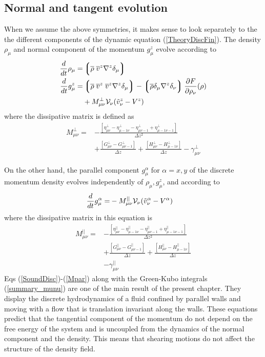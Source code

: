 \documentclass[b5paper,openright,11pt]{book}
\newcommand{\llg}{\left\lgroup}
\newcommand{\rlg}{\right\rgroup}
\begin{document}
\subsection{Normal and tangent evolution}
When we assume the above symmetries, it makes sense to look separately to the 
the different components of the dynamic equation (\ref{TheoryDiscFin}).
The density $\rho_\mu$ and normal  component of the momentum $g^{z}_\mu$
evolve according to
\begin{align}
\frac{d}{dt}\rho_\mu=&  \llg\overline{\rho} \; \overline{v}^{z}{\nabla}^{z}\delta_\mu \rlg
\nonumber\\
\frac{d}{dt}{g}^{z}_\mu=&
\llg\overline{\rho}\; \overline{v}^{z}\;\overline{v}^{z}{\nabla}^{z}\delta_{\mu}\rlg
-\llg\overline{\rho}\delta_{\mu}{\nabla}^{z}\delta_{\nu}\rlg
\frac{\partial  F}{\partial \rho_{\nu}}(\rho)
\nonumber\\
&+M_{\mu\nu}^{\bot}{\cal V}_\nu(\tilde{v}^{z}_\nu-V^{z})
\label{SoundDisc}
\end{align}
where the dissipative matrix is defined as
\begin{align}
M^{\bot}_{\mu\nu} 
=&-\frac{\left[\eta^\bot_{\mu\nu}-\eta^\bot_{\mu-1\nu}-\eta^\bot_{\mu\nu-1}+\eta^\bot_{\mu-1\nu-1}\right]}{\Delta z^2}
\nonumber\\
&+\frac{\left[{G}^\bot_{\mu\nu}-{G}^\bot_{\mu\nu-1}\right]}{\Delta z}
+\frac{\left[{H}^\bot_{\mu\nu}-{H}^\bot_{\mu-1\nu}\right]}{\Delta z}
-{\gamma}^\bot_{\mu\nu}
\label{Mbot}
\end{align}

On the other  hand, the parallel component  $g^\alpha_\mu$ for $\alpha
=x,y$  of  the  discrete  momentum density  evolves  independently  of
$\rho_\mu,g^{z}_\mu$, and according to
\begin{align}
  \frac{d}{dt}{g}^\alpha_\mu=&-M_{\mu\nu}^{||}{\cal V}_\nu(\tilde{v}^\alpha_\nu-V^\alpha)
\label{ShearDisc}
\end{align}
where the dissipative matrix in this equation is
\begin{align}
M^{||}_{\mu\nu} 
=&-\frac{\left[\eta^{||}_{\mu\nu}-\eta^{||}_{\mu-1\nu}-\eta^{||}_{\mu\nu-1}+\eta^{||}_{\mu-1\nu-1}\right]}{\Delta z^2}
\nonumber\\
&+\frac{\left[{G}^{||}_{\mu\nu}-{G}^{||}_{\mu\nu-1}\right]}{\Delta z}
+\frac{\left[{H}^{||}_{\mu\nu}-{H}^{||}_{\mu-1\nu}\right]}{\Delta z}
\nonumber\\
&-{\gamma}^{||}_{\mu\nu}
\label{Mpar}
\end{align}
Eqs (\ref{SoundDisc})-(\ref{Mpar}) along with the Green-Kubo integrals
(\ref{summary_munu})  are  one  of  the main  result  of  the  present
chapter. They display the discrete  hydrodynamics of a fluid confined by
parallel walls  and moving with  a flow that is  translation invariant
along the walls. These equations predict that the tangential component
of the momentum do not depend on  the free energy of the system and is
uncoupled  from  the   dynamics  of  the  normal   component  and  the
density.  This  means that  shearing
motions do not affect the structure of the density field.
\end{document}
